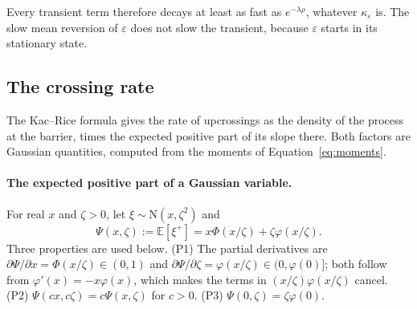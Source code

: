 \documentclass[a4paper,11pt]{article}
\theoremstyle{definition}
\newcommand{\E}{\mathbb E}
\newcommand{\1}{\mathbbm{1}}
\begin{document}
Every transient term therefore decays at least as fast as $e^{-\lambda\rho}$, whatever $\kappa_{\varepsilon}$ is. The slow mean reversion of $\varepsilon$ does not slow the transient, because $\varepsilon$ starts in its stationary state.

\subsection{The crossing rate}

The Kac--Rice formula gives the rate of upcrossings as the density of the process at the barrier, times the expected positive part of its slope there. Both factors are Gaussian quantities, computed from the moments of Equation~\eqref{eq:moments}.

\paragraph{The expected positive part of a Gaussian variable.} For real $x$ and $\zeta>0$, let $\xi\sim\mathrm{N}(x,\zeta^{2})$ and
\begin{equation}\label{eq:Psi}
\Psi(x,\zeta):=\E\left[\xi^{+}\right]=x\Phi(x/\zeta)+\zeta\varphi(x/\zeta).
\end{equation}
Three properties are used below. (P1) The partial derivatives are $\partial\Psi/\partial x=\Phi(x/\zeta)\in(0,1)$ and $\partial\Psi/\partial\zeta=\varphi(x/\zeta)\in(0,\varphi(0)]$; both follow from $\varphi'(x)=-x\varphi(x)$, which makes the terms in $(x/\zeta)\varphi(x/\zeta)$ cancel. (P2) $\Psi(cx,c\zeta)=c\Psi(x,\zeta)$ for $c>0$. (P3) $\Psi(0,\zeta)=\zeta\varphi(0)$.
\end{document}
